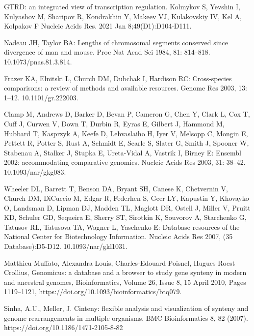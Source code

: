 \documentclass[12pt]{article}
\begin{document}


\begin{thebibliography}{99}

 GTRD: an integrated view of transcription regulation.
Kolmykov S, Yevshin I, Kulyashov M, Sharipov R, Kondrakhin Y, Makeev VJ,
Kulakovskiy IV, Kel A, Kolpakov F Nucleic Acids Res. 2021 Jan
8;49(D1):D104-D111.

 Nadeau JH, Taylor BA: Lengths of chromosomal segments
conserved since divergence of man and mouse. Proc Nat Acad Sci 1984,
81: 814–818. 10.1073/pnas.81.3.814.

 Frazer KA, Elnitski L, Church DM, Dubchak I, Hardison RC:
Cross-species comparisons: a review of methods and available resources.
Genome Res 2003, 13: 1–12. 10.1101/gr.222003.

 Clamp M, Andrews D, Barker D, Bevan P, Cameron G, Chen Y,
Clark L, Cox T, Cuff J, Curwen V, Down T, Durbin R, Eyras E, Gilbert J,
Hammond M, Hubbard T, Kasprzyk A, Keefe D, Lehvaslaiho H, Iyer V, Melsopp C,
Mongin E, Pettett R, Potter S, Rust A, Schmidt E, Searle S, Slater G, Smith J,
Spooner W, Stabenau A, Stalker J, Stupka E, Ureta-Vidal A, Vastrik I, Birney E:
Ensembl 2002: accommodating comparative genomics. Nucleic Acids Res 2003,
31: 38–42. 10.1093/nar/gkg083.

 Wheeler DL, Barrett T, Benson DA, Bryant SH, Canese K,
Chetvernin V, Church DM, DiCuccio M, Edgar R, Federhen S, Geer LY, Kapustin Y,
Khovayko O, Landsman D, Lipman DJ, Madden TL, Maglott DR, Ostell J, Miller V,
Pruitt KD, Schuler GD, Sequeira E, Sherry ST, Sirotkin K, Souvorov A,
Starchenko G, Tatusov RL, Tatusova TA, Wagner L, Yaschenko E: Database
resources of the National Center for Biotechnology Information. Nucleic Acids
Res 2007, (35 Database):D5-D12. 10.1093/nar/gkl1031.

 Matthieu Muffato, Alexandra Louis, Charles-Edouard Poisnel,
Hugues Roest Crollius, Genomicus: a database and a browser to study gene
synteny in modern and ancestral genomes, Bioinformatics, Volume 26, Issue 8,
15 April 2010, Pages 1119–1121, https://doi.org/10.1093/bioinformatics/btq079.

 Sinha, A.U., Meller, J. Cinteny: flexible analysis and
visualization of synteny and genome rearrangements in multiple organisms.
BMC Bioinformatics 8, 82 (2007). https://doi.org/10.1186/1471-2105-8-82


\end{thebibliography}
\end{document}
